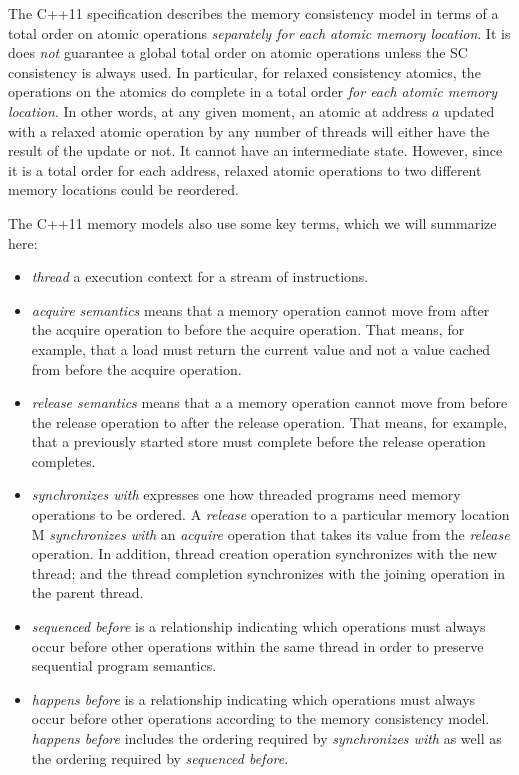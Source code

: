 The C++11 specification describes the memory consistency model in terms of
a total order on atomic operations \textit{separately for each atomic
memory location}. It is does \textit{not} guarantee a global total order
on atomic operations unless the SC consistency is always used. In
particular, for relaxed consistency atomics, the operations on the atomics
do complete in a total order \textit{for each atomic memory location}.  In
other words, at any given moment, an atomic at address $a$ updated with a
relaxed atomic operation by any number of threads will either have the
result of the update or not. It cannot have an intermediate state.
However, since it is a total order for each address, relaxed atomic
operations to two different memory locations could be reordered.

The C++11 memory models also use some key terms, which we will summarize here:

\begin{itemize}

  \item \textit{thread} a execution context for a stream of instructions.

  \item \textit{acquire semantics} means that a memory operation cannot move
  from after the acquire operation to before the acquire operation. That means,
  for example, that a load must return the current value and not a value cached
  from before the acquire operation.

  \item \textit{release semantics} means that a a memory operation cannot move
  from before the release operation to after the release operation. That means,
  for example, that a previously started store must complete before the release
  operation completes.

  \item \textit{synchronizes with} expresses one how threaded programs need
  memory operations to be ordered. A \textit{release} operation to a particular
  memory location M \textit{synchronizes with} an \textit{acquire} operation
  that takes its value from the \textit{release} operation. In addition, thread
  creation operation synchronizes with the new thread; and the thread
  completion synchronizes with the joining operation in the parent thread.

  \item \textit{sequenced before} is a relationship indicating which operations
  must always occur before other operations within the same thread in order to
  preserve sequential program semantics.

  \item \textit{happens before} is a relationship indicating which operations
  must always occur before other operations according to the memory consistency
  model. \textit{happens before} includes the ordering required by
  \textit{synchronizes with} as well as the ordering required by
  \textit{sequenced before}.

\end{itemize}
 

